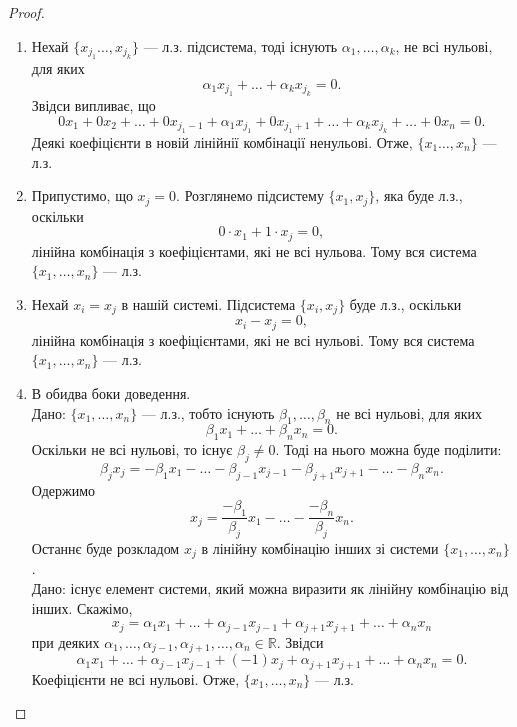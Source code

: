 \documentclass{math_library}
\begin{document}
	\begin{proof}
	\leavevmode
	\begin{enumerate}[topsep=-0pt, wide=0pt, label={\arabic*)}]
	\item Нехай $\{x_{j_1} \dots, x_{j_k}\}$ --- л.з. підсистема, тоді існують $\alpha_1, \dots, \alpha_k$, не всі нульові, для яких 
	\[
	\alpha_1 x_{j_1} + \dots + \alpha_k x_{j_k} = 0.
	\]
	Звідси випливає, що
	\[
	0x_1 + 0x_2 + \dots + 0x_{j_1-1} + \alpha_1 x_{j_1} + 0x_{j_1 + 1} + \dots + \alpha_k x_{j_k} + \dots + 0 x_n = 0.
	\]
	Деякі коефіцієнти в новій лінійнії комбінації ненульові. Отже, $\{x_1 \dots, x_n\}$ --- л.з.
	
	\item Припустимо, що $x_j = 0$. Розглянемо підсистему $\{x_1,x_j\}$, яка буде л.з., оскільки
	\[
	0 \cdot x_1 + 1 \cdot x_j = 0,
	\]
	лінійна комбінація з коефіцієнтами, які не всі нульова. Тому вся система $\{x_1,\dots,x_n\}$ --- л.з.
	
	\item Нехай $x_i = x_j$ в нашій системі. Підсистема $\{x_i,x_j\}$ буде л.з., оскільки
	\[
	x_i - x_j = 0,
	\]
	лінійна комбінація з коефіцієнтами, які не всі нульові. Тому вся система $\{x_1,\dots,x_n\}$ --- л.з.
	
	\item В обидва боки доведення.\\
	\rightproof Дано: $\{x_1, \dots, x_n\}$ --- л.з., тобто існують $\beta_1, \dots, \beta_n$ не всі нульові, для яких
	 \[
	 \beta_1 x_1 + \dots + \beta_n x_n = 0.
	 \]
	Оскільки не всі нульові, то існує $\beta_j \neq 0$. Тоді на нього можна буде поділити:
	\[
	\beta_j x_j = -\beta_1 x_1 - \dots - \beta_{j-1} x_{j-1} - \beta_{j+1} x_{j+1} - \dots - \beta_n x_n.
	\]
	Одержимо
	\[
	x_j = \frac{-\beta_1}{\beta_j}x_1 - \dots - \frac{-\beta_n}{\beta_j}x_n.
	\]
	Останнє буде розкладом $x_j$ в лінійну комбінацію інших зі системи $\{x_1,\dots,x_n\}$.
	\bigskip \\
	\leftproof Дано: існує елемент системи, який можна виразити як лінійну комбінацію від інших. Скажімо,
	\[
	x_j = \alpha_1 x_1 + \dots + \alpha_{j-1} x_{j-1} + \alpha_{j+1} x_{j+1} + \dots + \alpha_n x_n
	\]
	при деяких $\alpha_1,\dots,\alpha_{j-1},\alpha_{j+1},\dots,\alpha_n \in \mathbb{R}$. Звідси
	\[
	\alpha_1 x_1 + \dots + \alpha_{j-1} x_{j-1} + (-1)x_j + \alpha_{j+1} x_{j+1} + \dots + \alpha_n x_n = 0.
	\]
	Коефіцієнти не всі нульові. Отже, $\{x_1, \dots, x_n\}$ --- л.з. \qedhere
	\end{enumerate}
	\end{proof}
	
\end{document}
